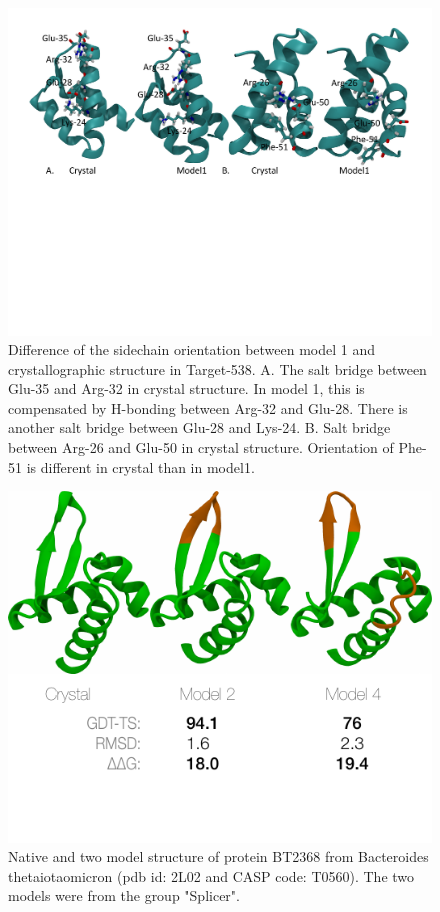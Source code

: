 \documentclass[12pt]{article}
\begin{document}
\begin{figure}
\begin{center}
\includegraphics[width=4.9 in,height=4.0 in]{Target_538_compare.pdf}
\end{center}
\caption{Difference of the sidechain orientation between model 1 and crystallographic structure in Target-538.
A. The salt bridge between Glu-35 and Arg-32 in crystal structure. In model 1, this is compensated by H-bonding between 
Arg-32 and Glu-28. There is another salt bridge between Glu-28 and Lys-24.
B. Salt bridge between Arg-26 and Glu-50 in crystal structure. Orientation of Phe-51 is different in crystal than in model1.}
\label{fig:T0538compare}
\end{figure}


\begin{figure}
\begin{center}
\includegraphics[width=3.5 in,height=3.0 in]{T0560.pdf}
\end{center}
\caption{Native and two model structure of protein BT2368 from Bacteroides thetaiotaomicron (pdb id: 2L02 and CASP code: T0560). The two models
were from the group "Splicer".}
\label{fig:T0560}
\end{figure}
\end{document}
